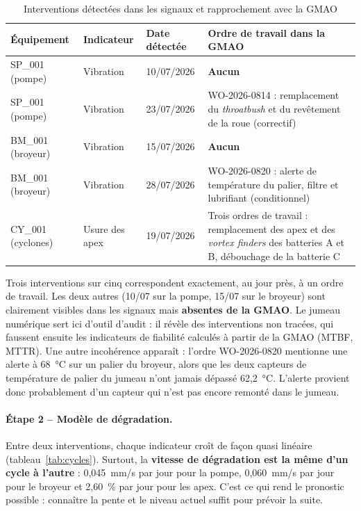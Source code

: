 \begin{table}[H]
\centering
\caption{Interventions détectées dans les signaux et rapprochement avec la GMAO}
\label{tab:interventions}
\small
\begin{tabularx}{\textwidth}{l l l X}
\toprule
\textbf{Équipement} & \textbf{Indicateur} & \textbf{Date détectée} & \textbf{Ordre de travail dans la GMAO} \\
\midrule
SP\_001 (pompe) & Vibration & 10/07/2026 & \textbf{Aucun} \\
SP\_001 (pompe) & Vibration & 23/07/2026 & WO-2026-0814 : remplacement du \textit{throatbush} et du revêtement de la roue (correctif) \\
BM\_001 (broyeur) & Vibration & 15/07/2026 & \textbf{Aucun} \\
BM\_001 (broyeur) & Vibration & 28/07/2026 & WO-2026-0820 : alerte de température du palier, filtre et lubrifiant (conditionnel) \\
CY\_001 (cyclones) & Usure des apex & 19/07/2026 & Trois ordres de travail : remplacement des apex et des \textit{vortex finders} des batteries A et B, débouchage de la batterie C \\
\bottomrule
\end{tabularx}
\end{table}

Trois interventions sur cinq correspondent exactement, au jour près, à un ordre de travail. Les deux autres (10/07 sur la pompe, 15/07 sur le broyeur) sont clairement visibles dans les signaux mais \textbf{absentes de la GMAO}. Le jumeau numérique sert ici d'outil d'audit : il révèle des interventions non tracées, qui faussent ensuite les indicateurs de fiabilité calculés à partir de la GMAO (MTBF, MTTR). Une autre incohérence apparaît : l'ordre WO-2026-0820 mentionne une alerte à 68~°C sur un palier du broyeur, alors que les deux capteurs de température de palier du jumeau n'ont jamais dépassé 62,2~°C. L'alerte provient donc probablement d'un capteur qui n'est pas encore remonté dans le jumeau.

\paragraph{Étape 2 -- Modèle de dégradation.} Entre deux interventions, chaque indicateur croît de façon quasi linéaire (tableau~\ref{tab:cycles}). Surtout, la \textbf{vitesse de dégradation est la même d'un cycle à l'autre} : 0,045~mm/s par jour pour la pompe, 0,060~mm/s par jour pour le broyeur et 2,60~\% par jour pour les apex. C'est ce qui rend le pronostic possible : connaître la pente et le niveau actuel suffit pour prévoir la suite.

